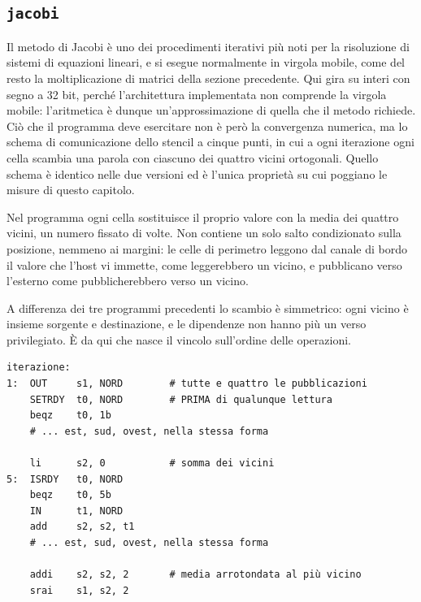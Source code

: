 \subsection{\texttt{jacobi}}
\label{sec:kernel-jacobi}

Il metodo di Jacobi è uno dei procedimenti iterativi più noti per la
risoluzione di sistemi di equazioni lineari, e si esegue normalmente in virgola
mobile, come del resto la moltiplicazione di matrici della sezione precedente.
Qui gira su interi con segno a 32 bit, perché l'architettura implementata non
comprende la virgola mobile: l'aritmetica è dunque un'approssimazione di quella che il metodo richiede. Ciò
che il programma deve esercitare non è però la convergenza numerica, ma lo
schema di comunicazione dello stencil a cinque punti, in cui a ogni iterazione
ogni cella scambia una parola con ciascuno dei quattro vicini ortogonali.
Quello schema è identico nelle due versioni ed è l'unica proprietà su cui
poggiano le misure di questo capitolo.

Nel programma ogni cella sostituisce il proprio valore con la media dei quattro vicini,
un numero fissato di volte. Non contiene un solo salto condizionato sulla posizione, nemmeno ai
margini: le celle di perimetro leggono dal canale di bordo il valore che l'host vi immette,
come leggerebbero un vicino, e pubblicano verso l'esterno come pubblicherebbero verso un vicino.


A differenza dei tre programmi precedenti lo scambio è simmetrico: ogni vicino è
insieme sorgente e destinazione, e le dipendenze non hanno più un verso
privilegiato. È da qui che nasce il vincolo sull'ordine delle operazioni.

\begin{lstlisting}[caption={La struttura di un'iterazione di \texttt{jacobi.s}},label={lst:jacobi},language=RISCV,float=htbp]
iterazione:
1:  OUT     s1, NORD        # tutte e quattro le pubblicazioni
    SETRDY  t0, NORD        # PRIMA di qualunque lettura
    beqz    t0, 1b
    # ... est, sud, ovest, nella stessa forma

    li      s2, 0           # somma dei vicini
5:  ISRDY   t0, NORD
    beqz    t0, 5b
    IN      t1, NORD
    add     s2, s2, t1
    # ... est, sud, ovest, nella stessa forma

    addi    s2, s2, 2       # media arrotondata al più vicino
    srai    s1, s2, 2
\end{lstlisting}


